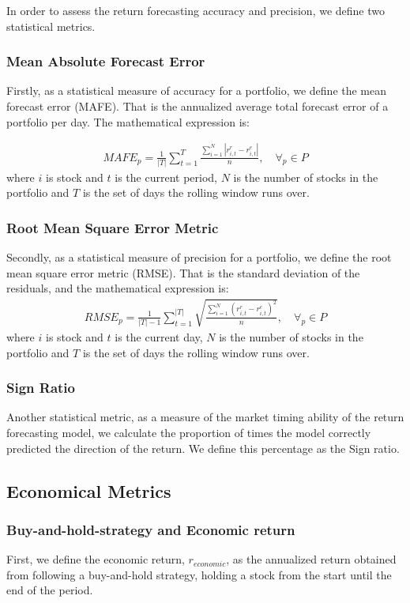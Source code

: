 In order to assess the return forecasting accuracy and precision, we define two statistical metrics. 

\subsubsection{Mean Absolute Forecast Error}
Firstly, as a statistical measure of accuracy for a portfolio, we define the mean forecast error (MAFE). That is the annualized average total forecast error of a portfolio per day. The mathematical expression is:

\begin{align}
    MAFE_{p} =  \frac{1}{|T|}\sum_{t=1}^{T}\frac{\sum_{i=1}^{N}|r_{i,t}^{r} - r_{i,t}^{e}|}{n}, \quad \forall_p \in P
\end{align}
where $i$ is stock and $t$ is the current period, $N$ is the number of stocks in the portfolio and $T$ is the set of days the rolling window runs over.

\subsubsection{Root Mean Square Error Metric}
Secondly, as a statistical measure of precision for a portfolio, we define the root mean square error metric (RMSE). That is the standard deviation of the residuals, and the mathematical expression is:
\begin{align}
    RMSE_{p} = \frac{1}{|T|-1}\sum_{t=1}^{|T|}\sqrt{\frac{\sum_{i=1}^{N}(r_{i,t}^{r} - r_{i,t}^{e})^{2}}{n}}, \quad \forall_p \in P
\end{align}
where $i$ is stock and $t$ is the current day, $N$ is the number of stocks in the portfolio and $T$ is the set of days the rolling window runs over.

\subsubsection{Sign Ratio}
Another statistical metric, as a measure of the market timing ability of the return forecasting model, we calculate the proportion of times the model correctly predicted the direction of the return. We define this percentage as the Sign ratio.

\subsection{Economical Metrics}

\subsubsection{Buy-and-hold-strategy and Economic return}
First, we define the economic return, $r_{economic}$, as the annualized return obtained from following a buy-and-hold strategy, holding a stock from the start until the end of the period. 

